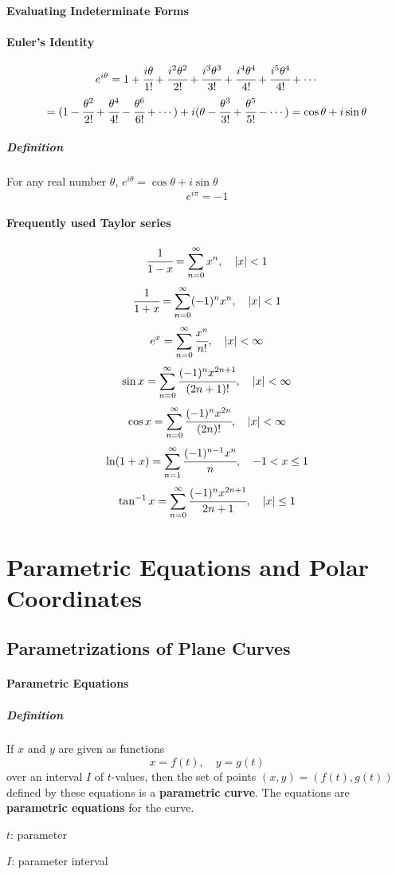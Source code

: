 \documentclass{article}
\begin{document}
            \paragraph{Evaluating Indeterminate Forms}
            \paragraph{Euler's Identity}
                \[e^{i\theta}=1+\cfrac{i\theta}{1!}+\cfrac{i^2\theta^2}{2!}+\cfrac{i^3\theta^3}{3!}+\cfrac{i^4\theta^4}{4!}+\cfrac{i^5\theta^4}{4!}+\cdots\]
                \[=(1-\cfrac{\theta^2}{2!}+\cfrac{\theta^4}{4!}-\cfrac{\theta^6}{6!}+\cdots)+i(\theta-\cfrac{\theta^3}{3!}+\cfrac{\theta^5}{5!}-\cdots)=\cos \theta +i\sin \theta\]
                \subparagraph{Definition} For any real number $\theta$, $e^{i\theta}=\cos \theta+i\sin\theta$
                \[e^{i\pi}=-1\]
            \paragraph{Frequently used Taylor series}
            \[\cfrac{1}{1-x}=\sum_{n=0}^\infty x^n,\quad |x|<1\]
            \[\cfrac{1}{1+x}=\sum_{n=0}^\infty (-1)^nx^n,\quad |x|<1\]
            \[e^x=\sum_{n=0}^\infty \cfrac{x^n}{n!},\quad|x|<\infty\]
            \[\sin x=\sum_{n=0}^\infty\cfrac{(-1)^n x^{2n+1}}{(2n+1)!},\quad |x|<\infty\]
            \[\cos x=\sum_{n=0}^\infty\cfrac{(-1)^nx^{2n}}{(2n)!},\quad |x|<\infty\]
            \[\ln(1+x)=\sum_{n=1}^\infty\cfrac{(-1)^{n-1}x^n}{n},\quad -1<x\le 1\]
            \[\tan ^{-1}x=\sum_{n=0}^\infty\cfrac{(-1)^n x^{2n+1}}{2n+1},\quad |x|\le 1\]
    
    \newpage
    \section{Parametric Equations and Polar Coordinates}
        \subsection{Parametrizations of Plane Curves}
            \paragraph{Parametric Equations}
                \subparagraph{Definition} If $x$ and $y$ are given as functions
                \[x=f(t),\quad y=g(t)\]
                over an interval $I$ of $t$-values, then the set of points $(x,y)=(f(t),g(t))$ defined by these equations is a \textbf{parametric curve}. The equations are \textbf{parametric equations} for the curve.
                \par $t$: parameter
                \par $I$: parameter interval
\end{document}
